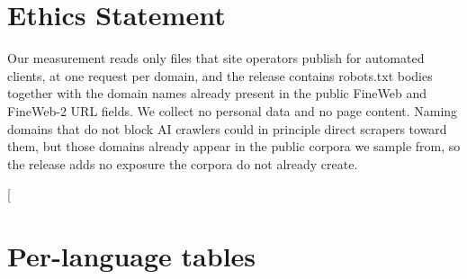 \documentclass[11pt]{article}
\begin{document}
\section*{Ethics Statement}

Our measurement reads only files that site operators publish for automated clients, at one request per domain, and the release contains robots.txt bodies together with the domain names already present in the public FineWeb and FineWeb-2 URL fields. We collect no personal data and no page content. Naming domains that do not block AI crawlers could in principle direct scrapers toward them, but those domains already appear in the public corpora we sample from, so the release adds no exposure the corpora do not already create.



\raggedbottom
\appendix
\setlength{\dblfloatsep}{10pt}
\setlength{\textfloatsep}{10pt}
\setlength{\floatsep}{10pt}
\makeatletter
\setlength{\@dblfptop}{0pt}
\setlength{\@dblfpsep}{10pt}
\setlength{\@dblfpbot}{0pt}
\makeatother
\twocolumn[
\section{Per-language tables}
\label{sec:appendix}
\end{document}

